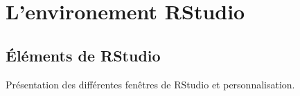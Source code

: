 \section{L'environement RStudio}
%

\subsection{Éléments de RStudio}
Présentation des différentes fenêtres de RStudio et personnalisation.\\





